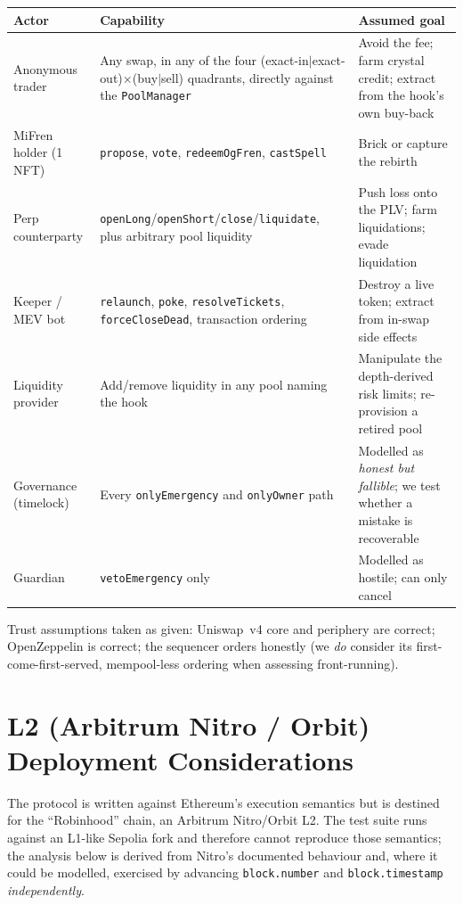 \documentclass[10pt,a4paper]{article}
\newcommand{\code}[1]{\texttt{\small #1}}
\begin{document}
\begin{center}\small
\begin{tabular}{@{}p{3.4cm}p{5.6cm}p{6.4cm}@{}}
\toprule
\textbf{Actor} & \textbf{Capability} & \textbf{Assumed goal} \\
\midrule
Anonymous trader & Any swap, in any of the four
(exact-in$|$exact-out)$\times$(buy$|$sell) quadrants, directly against the
\code{PoolManager} & Avoid the fee; farm crystal credit; extract from the hook's
own buy-back \\
MiFren holder (1 NFT) & \code{propose}, \code{vote}, \code{redeemOgFren},
\code{castSpell} & Brick or capture the rebirth \\
Perp counterparty & \code{openLong}/\code{openShort}/\code{close}/\code{liquidate},
plus arbitrary pool liquidity & Push loss onto the PLV; farm liquidations; evade
liquidation \\
Keeper / MEV bot & \code{relaunch}, \code{poke}, \code{resolveTickets},
\code{forceCloseDead}, transaction ordering & Destroy a live token; extract from
in-swap side effects \\
Liquidity provider & Add/remove liquidity in any pool naming the hook & Manipulate the
depth-derived risk limits; re-provision a retired pool \\
Governance (timelock) & Every \code{onlyEmergency} and \code{onlyOwner} path & Modelled as
\emph{honest but fallible}; we test whether a mistake is recoverable \\
Guardian & \code{vetoEmergency} only & Modelled as hostile; can only cancel \\
\bottomrule
\end{tabular}
\end{center}

\noindent
Trust assumptions taken as given: Uniswap~v4 core and periphery are correct;
OpenZeppelin is correct; the sequencer orders honestly (we \emph{do} consider its
first-come-first-served, mempool-less ordering when assessing front-running).

\section{L2 (Arbitrum Nitro / Orbit) Deployment Considerations}\label{sec:l2}

The protocol is written against Ethereum's execution semantics but is destined for the
``Robinhood'' chain, an Arbitrum Nitro/Orbit L2. The test suite runs against an
L1-like Sepolia fork and therefore cannot reproduce those semantics; the analysis below is
derived from Nitro's documented behaviour and, where it could be modelled, exercised by
advancing \code{block.number} and \code{block.timestamp} \emph{independently}.
\end{document}
